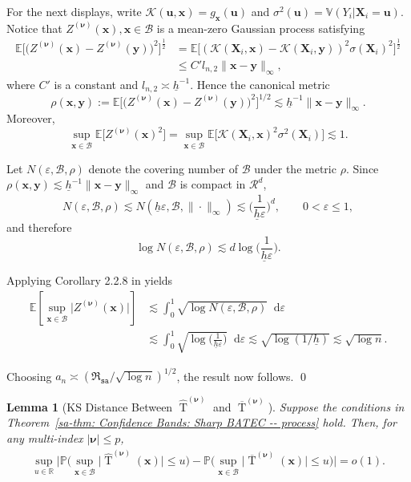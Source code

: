 \documentclass[10pt]{article}
\newtheorem{lem}{Lemma}
\DeclareMathOperator{\Tstat}{T}
\renewcommand{\P}{\mathbb{P}}
\newcommand{\E}{\mathbb{E}}
\newcommand{\Var}{\mathbb{V}}
\newcommand{\reals}{\mathbb{R}}
\newcommand{\dif}{\mathop{}\!\mathrm{d}}
\newcommand{\bu}{\mathbf{u}}
\newcommand{\bx}{\mathbf{x}}
\newcommand{\bX}{\mathbf{X}}
\newcommand{\by}{\mathbf{y}}
\newcommand{\bnu}{\boldsymbol{\nu}}
\newcommand{\B}{\mathcal{B}}
\newcommand{\K}{\mathscr{K}}
\newcommand{\R}{\mathcal{R}}
\begin{document}
For the next displays, write $\K(\bu,\bx)=g_{\bx}(\bu)$ and $\sigma^2(\bu)=\Var(Y_i|\bX_i=\bu)$. Notice that $Z^{(\bnu)}(\bx), \bx \in \B$ is a mean-zero Gaussian process satisfying
\begin{align*}
    \E \big[\big(Z^{(\bnu)}(\bx) - Z^{(\bnu)}(\by)\big)^2\big]^{\frac{1}{2}}
    &= \E \big[(\K(\bX_i, \bx) - \K(\bX_i, \by))^2 \sigma(\bX_i)^2\big]^{\frac{1}{2}}  \\
    &\leq C' l_{n,2} \|\bx - \by\|_{\infty},
\end{align*}
where $C'$ is a constant and $l_{n,2} \asymp \underline h^{-1}$. Hence the canonical metric
$$
\rho(\bx,\by)
:= \E \big[\big(Z^{(\bnu)}(\bx) - Z^{(\bnu)}(\by)\big)^2\big]^{1/2}
\lesssim \underline h^{-1}\|\bx-\by\|_{\infty}.
$$
Moreover,
$$
\sup_{\bx\in\B} \E \big[ Z^{(\bnu)}(\bx)^2 \big]
= \sup_{\bx\in\B} \E \big[\K(\bX_i,\bx)^2 \sigma^2(\bX_i)\big]
\lesssim 1.
$$

Let $N(\varepsilon,\B,\rho)$ denote the covering number of $\B$ under the metric $\rho$.
Since $\rho(\bx,\by)\lesssim \underline h^{-1}\|\bx-\by\|_{\infty}$ and $\B$ is compact in $\R^d$,
$$
N(\varepsilon,\B,\rho)
\lesssim
N(\underline h\varepsilon,\B,\|\cdot\|_{\infty})
\lesssim
\Big(\frac{1}{\underline h\varepsilon}\Big)^d,
\qquad 0<\varepsilon\le 1,
$$
and therefore
$$
\log N(\varepsilon,\B,\rho)
\lesssim
d\log\!\Big(\frac{1}{\underline h\varepsilon}\Big).
$$

Applying Corollary 2.2.8 in \cite{van-der-Vaart-Wellner_1996_Book} yields
\begin{align*}
\E\!\left[\sup_{\bx\in\B}\big|Z^{(\bnu)}(\bx)\big|\right]
&\lesssim
\int_0^{1}
\sqrt{\log N(\varepsilon,\B,\rho)}\dif \varepsilon  \\
&\lesssim
\int_0^{1}
\sqrt{\log\!\Big(\frac{1}{\underline h\varepsilon}\Big)}\dif \varepsilon
\lesssim
\sqrt{\log(1/\underline h)} \lesssim \sqrt{\log n}.
\end{align*}

Choosing $a_n \asymp (\mathfrak{R}_{\mathtt{sa}}/\sqrt{\log n})^{1/2}$, the result now follows.
\qed

\begin{lem}[KS Distance Between $\widehat{\Tstat}^{(\bnu)}$ and $\overline{\Tstat}^{(\bnu)}$]\label{sa-lem: t stats to bahadur}
Suppose the conditions in Theorem~\ref{sa-thm: Confidence Bands: Sharp BATEC -- process} hold. Then, for any multi-index $|\bnu| \leq p$,
\begin{align*}
    \sup_{u \in \reals} \Big| \P \Big(\sup_{\bx \in \B} \big|\widehat{\Tstat}^{(\bnu)}(\bx)\big| \leq u\Big)
    - \P \Big(\sup_{\bx \in \B} \big|\overline{\Tstat}^{(\bnu)}(\bx)\big| \leq u \Big)\Big| = o(1).
\end{align*}
\end{lem}
\end{document}
